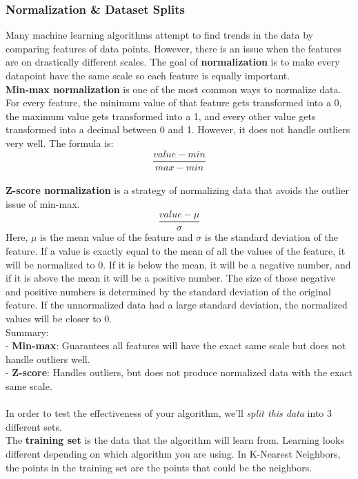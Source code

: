 \documentclass[11pt, a4paper]{article}
\begin{document}
\begin{spacing}{1.1}
	\subsubsection{Normalization \& Dataset Splits}
	Many machine learning algorithms attempt to find trends in the data by comparing features of data points. However, there is an issue when the features are on drastically different scales. The goal of \textbf{normalization} is to make every datapoint have the same scale so each feature is equally important. \vspace*{1.5mm} \\ 
	\textbf{Min-max normalization} is one of the most common ways to normalize data. For every feature, the minimum value of that feature gets transformed into a 0, the maximum value gets transformed into a 1, and every other value gets transformed into a decimal between 0 and 1. However, it does not handle outliers very well. The formula is: $$ \frac{value - min}{max - min} $$ \\
	\textbf{Z-score normalization} is a strategy of normalizing data that avoids the outlier issue of min-max. $$ \frac{value - \mu}{\sigma} $$ Here, $\mu$ is the mean value of the feature and $\sigma$ is the standard deviation of the feature. If a value is exactly equal to the mean of all the values of the feature, it will be normalized to 0. If it is below the mean, it will be a negative number, and if it is above the mean it will be a positive number. The size of those negative and positive numbers is determined by the standard deviation of the original feature. If the unnormalized data had a large standard deviation, the normalized values will be closer to 0. \vspace*{1.5mm} \\
	Summary: \\
	\hspace*{2mm} - \textbf{Min-max}: Guarantees all features will have the exact same scale but does not handle outliers well. \\
	\hspace*{2mm} - \textbf{Z-score}: Handles outliers, but does not produce normalized data with the exact same scale. \\~\\
	In order to test the effectiveness of your algorithm, we’ll \textit{split this data} into 3 different sets. \vspace*{1.5mm} \\
	The \textbf{training set} is the data that the algorithm will learn from. Learning looks different depending on which algorithm you are using. In K-Nearest Neighbors, the points in the training set are the points that could be the neighbors. \vspace*{1.5mm} \\

\end{spacing}
\end{document}
